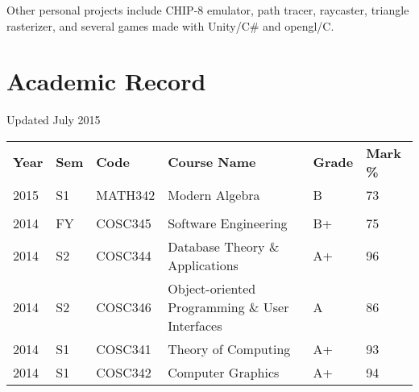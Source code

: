 \documentclass[a4paper, oneside, final]{scrartcl}
\begin{document}
	\noindent
	Other personal projects include CHIP-8 emulator, path tracer, raycaster, triangle rasterizer, and several games made with Unity/C\# and opengl/C.\\
\fi
    
	\iffalse
      \pagebreak
      \section{Academic Record}
      Updated July 2015

      \begin{table}[h]
        \begin{tabular}{llllll}
        \rowcolor{Gray}
        \textbf{Year} & \textbf{Sem} & \textbf{Code} & \textbf{Course Name} & \textbf{Grade} & \textbf{Mark \%} \\
        2015 & S1  & MATH342 & Modern Algebra                                  & B    & 73      \\
             &     &         &                                                 &       &         \\
        2014 & FY  & COSC345 & Software Engineering                            & B+    & 75      \\
        2014 & S2  & COSC344 & Database Theory \& Applications                 & A+    & 96      \\
        2014 & S2  & COSC346 & Object-oriented Programming \& User Interfaces  & A     & 86      \\
        2014 & S1  & COSC341 & Theory of Computing                             & A+    & 93      \\
        2014 & S1  & COSC342 & Computer Graphics                               & A+    & 94      \\

\end{tabular}
\end{table}
\end{document}
